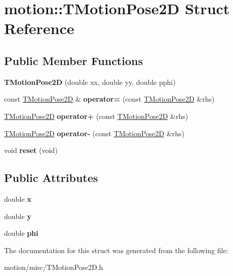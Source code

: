 \hypertarget{structmotion_1_1TMotionPose2D}{}\section{motion\+:\+:T\+Motion\+Pose2D Struct Reference}
\label{structmotion_1_1TMotionPose2D}
\subsection*{Public Member Functions}
\begin{DoxyCompactItemize}
\item 
\mbox{\label{structmotion_1_1TMotionPose2D_a95c04345793f02fbc32792a9739d754d}} 
{\bfseries T\+Motion\+Pose2D} (double xx, double yy, double pphi)
\item 
\mbox{\label{structmotion_1_1TMotionPose2D_ae2879a58d5ba238d4137a049170cda83}} 
const \mbox{\hyperlink{structmotion_1_1TMotionPose2D}{T\+Motion\+Pose2D}} \& {\bfseries operator=} (const \mbox{\hyperlink{structmotion_1_1TMotionPose2D}{T\+Motion\+Pose2D}} \&rhs)
\item 
\mbox{\label{structmotion_1_1TMotionPose2D_ac678e92a153d2f21f2967846ce2a128e}} 
\mbox{\hyperlink{structmotion_1_1TMotionPose2D}{T\+Motion\+Pose2D}} {\bfseries operator+} (const \mbox{\hyperlink{structmotion_1_1TMotionPose2D}{T\+Motion\+Pose2D}} \&rhs)
\item 
\mbox{\label{structmotion_1_1TMotionPose2D_ada5c57be32bc815786bbd377e4db8b1d}} 
\mbox{\hyperlink{structmotion_1_1TMotionPose2D}{T\+Motion\+Pose2D}} {\bfseries operator-\/} (const \mbox{\hyperlink{structmotion_1_1TMotionPose2D}{T\+Motion\+Pose2D}} \&rhs)
\item 
\mbox{\label{structmotion_1_1TMotionPose2D_a528b2418d8a4ebcbc5c8e3e0d160b66a}} 
void {\bfseries reset} (void)
\end{DoxyCompactItemize}
\subsection*{Public Attributes}
\begin{DoxyCompactItemize}
\item 
\mbox{\label{structmotion_1_1TMotionPose2D_a13a051574ba46d53cf3cf75d1fd12ea6}} 
double {\bfseries x}
\item 
\mbox{\label{structmotion_1_1TMotionPose2D_aa00ac7540cebe1e39f7a27961719ad72}} 
double {\bfseries y}
\item 
\mbox{\label{structmotion_1_1TMotionPose2D_a4bf517b21f755bcb7fe0f938eaaad3ee}} 
double {\bfseries phi}
\end{DoxyCompactItemize}


The documentation for this struct was generated from the following file\+:\begin{DoxyCompactItemize}
\item 
motion/misc/T\+Motion\+Pose2\+D.\+h\end{DoxyCompactItemize}
